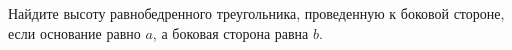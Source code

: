\begin{ex}
	\begin{condition}
		Найдите высоту равнобедренного треугольника, проведенную к боковой стороне, если основание равно \( a \), а боковая	сторона равна \( b \).
	\end{condition}
\end{ex}